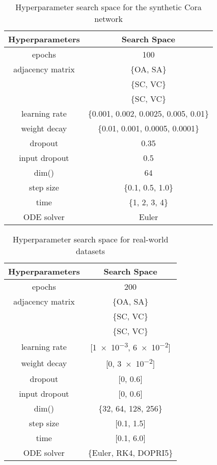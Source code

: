 \documentclass{article}
\theoremstyle{plain}
\theoremstyle{definition}
\theoremstyle{remark}
\begin{document}
\begin{table}[ht!]
    \centering
    \caption{Hyperparameter search space for the synthetic Cora network}
    \label{tab:search_homophily}
    \begin{tabular}{cc} \toprule
        Hyperparameters  &  Search Space \\ \midrule
        epochs           & 100 \\
adjacency matrix & \{OA, SA\}\\
                 & \{SC, VC\}\\\
                  & \{SC, VC\}\\
        learning rate    & \{0.001, 0.002, 0.0025, 0.005, 0.01\}\\
        weight decay     & \{0.01, 0.001, 0.0005, 0.0001\}\\
        dropout          & 0.35\\
        input dropout    & 0.5\\
        dim()& 64\\
        step size  & \{0.1, 0.5, 1.0\}\\
        time          & \{1, 2, 3, 4\}\\
        ODE solver       & Euler\\
        \bottomrule
    \end{tabular}
\end{table}

\begin{table}[ht!]
    \centering
    \caption{Hyperparameter search space for real-world datasets}
    \label{tab:search_real}
    \begin{tabular}{cc} \toprule
        Hyperparameters  &  Search Space \\ \midrule
epochs           & 200\\
        adjacency matrix & \{OA, SA\}\\
                 & \{SC, VC\}\\
                  & \{SC, VC\}\\
        learning rate    & [\num{1e-3}, \num{6e-2}]\\
        weight decay     & [\num{0}, \num{3e-2}]\\
        dropout          & [\num{0}, \num{0.6}]\\
        input dropout    & [\num{0}, \num{0.6}]\\
        dim()& \{32, 64, 128, 256\}\\
        step size  & [0.1, 1.5]\\
        time          & [0.1, 6.0]\\
        ODE solver       & \{Euler, RK4, DOPRI5\}\\
        \bottomrule
    \end{tabular}
\end{table}
\end{document}
